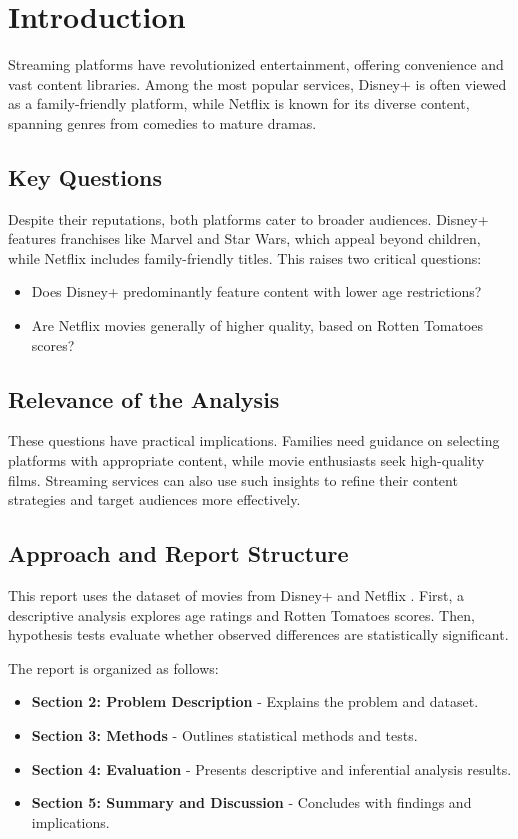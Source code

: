 \section{Introduction}

Streaming platforms have revolutionized entertainment, offering convenience and vast content libraries. Among the most popular services, Disney+ is often viewed as a family-friendly platform, while Netflix is known for its diverse content, spanning genres from comedies to mature dramas.

\subsection{Key Questions}

Despite their reputations, both platforms cater to broader audiences. Disney+ features franchises like Marvel and Star Wars, which appeal beyond children, while Netflix includes family-friendly titles. This raises two critical questions:
\begin{itemize}
    \item Does Disney+ predominantly feature content with lower age restrictions?
    \item Are Netflix movies generally of higher quality, based on Rotten Tomatoes scores?
\end{itemize}

\subsection{Relevance of the Analysis}

These questions have practical implications. Families need guidance on selecting platforms with appropriate content, while movie enthusiasts seek high-quality films. Streaming services can also use such insights to refine their content strategies and target audiences more effectively. \cite{Nielsen2021}

\subsection{Approach and Report Structure}

This report uses the dataset of movies from Disney+ and Netflix \cite{dataset}. First, a descriptive analysis explores age ratings and Rotten Tomatoes scores. Then, hypothesis tests evaluate whether observed differences are statistically significant.

The report is organized as follows:
\begin{itemize}
    \item \textbf{Section 2: Problem Description} - Explains the problem and dataset.
    \item \textbf{Section 3: Methods} - Outlines statistical methods and tests.
    \item \textbf{Section 4: Evaluation} - Presents descriptive and inferential analysis results.
    \item \textbf{Section 5: Summary and Discussion} - Concludes with findings and implications.
\end{itemize}
